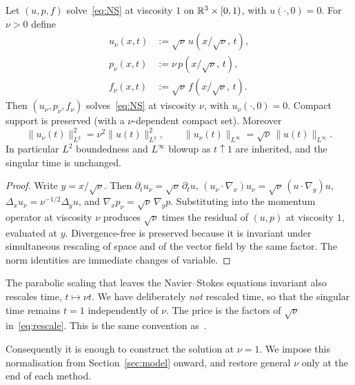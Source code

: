 \begin{lemma}
\label{lem:rescale}
Let $(u,p,f)$ solve~\eqref{eq:NS} at viscosity $1$ on $\mathbb{R}^3\times[0,1)$, with $u(\cdot,0)=0$. For $\nu>0$ define
\begin{equation}
\label{eq:rescale}
\begin{aligned}
u_\nu(x,t)&:=\sqrt{\nu}\,u(x/\sqrt{\nu},\,t),\\
p_\nu(x,t)&:=\nu\, p(x/\sqrt{\nu},\,t),\\
f_\nu(x,t)&:=\sqrt{\nu}\,f(x/\sqrt{\nu},\,t).
\end{aligned}
\end{equation}
Then $(u_\nu,p_\nu,f_\nu)$ solves~\eqref{eq:NS} at viscosity $\nu$, with $u_\nu(\cdot,0)=0$. Compact support is preserved (with a $\nu$-dependent compact set). Moreover
\[
\|u_\nu(t)\|_{L^2}^2=\nu^{2}\|u(t)\|_{L^2}^2,
\qquad
\|u_\nu(t)\|_{L^\infty}=\sqrt{\nu}\,\|u(t)\|_{L^\infty}.
\]
In particular $L^2$ boundedness and $L^\infty$ blowup as $t\uparrow 1$ are inherited, and the singular time is unchanged.
\end{lemma}

\begin{proof}
Write $y=x/\sqrt{\nu}$. Then $\partial_t u_\nu=\sqrt{\nu}\,\partial_t u$, $(u_\nu\cdot\nabla_x)u_\nu=\sqrt{\nu}\,(u\cdot\nabla_y)u$, $\Delta_x u_\nu=\nu^{-1/2}\Delta_y u$, and $\nabla_x p_\nu=\sqrt{\nu}\,\nabla_y p$. Substituting into the momentum operator at viscosity $\nu$ produces $\sqrt{\nu}$ times the residual of $(u,p)$ at viscosity $1$, evaluated at $y$. Divergence-free is preserved because it is invariant under simultaneous rescaling of space and of the vector field by the same factor. The norm identities are immediate changes of variable.
\end{proof}

\begin{remark}
\label{rem:rescale-time}
The parabolic scaling that leaves the {N}avier--{S}tokes equations invariant also rescales time, $t\mapsto \nu t$. We have deliberately \emph{not} rescaled time, so that the singular time remains $t=1$ independently of $\nu$. The price is the factors of $\sqrt{\nu}$ in~\eqref{eq:rescale}. This is the same convention as~\cite{openai2026ns}.
\end{remark}

Consequently it is enough to construct the solution at $\nu=1$. We impose this normalisation from Section~\ref{sec:model} onward, and restore general $\nu$ only at the end of each method.

